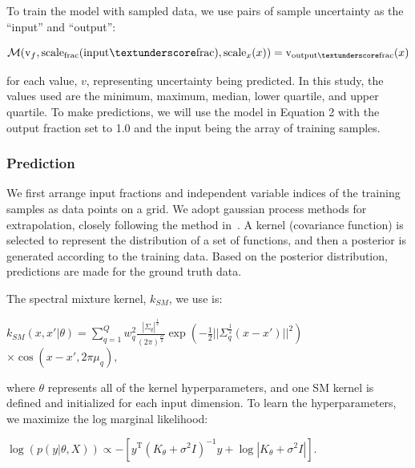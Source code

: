 To train the model with sampled data, we use pairs of sample uncertainty as the ``input'' and ``output'':

\begin{equation}
\mathcal{M}(\mathrm{v}_f, \mathrm{scale}_{\mathrm{frac}}(\mathrm{input\textunderscore frac}), \mathrm{scale}_x(x)) = \mathrm{v}_{\mathrm{output\textunderscore frac}}(x)
\end{equation}

for each value, $v$, representing uncertainty being predicted. In this study, the values used are the minimum, maximum, median, lower quartile, and upper quartile. To make predictions, we will use the model in Equation 2 with the output fraction set to 1.0 and the input being the array of training samples. 


\subsubsection{Prediction}
We first arrange input fractions and independent variable indices of the training samples as data points on a grid. We adopt gaussian process methods for extrapolation, closely following the method in~\cite{pmlr-v28-wilson13}. A kernel (covariance function) is selected to represent the distribution of a set of functions, and then a posterior is generated according to the training data. Based on the posterior distribution, predictions are made for the ground truth data.

The spectral mixture kernel, $k_{SM}$, we use is:
\begin{center}
$k_{SM}(x, x'|\theta) = $$\sum_{q=1}^{Q}$$w_q^2\frac{|\Sigma_q|^\frac{1}{2}}{(2\pi)^\frac{D}{2}}\exp(-\frac{1}{2}||\Sigma_q^\frac{1}{2}(x - x')||^2)$\\ 
$\times\cos(x - x', 2\pi\mu_q),$
\end{center}

where $\theta$ represents all of the kernel hyperparameters, and one SM kernel is defined and initialized for each input dimension. To learn the hyperparameters, we maximize the log marginal likelihood:
\begin{center}
$\log(p(y|\theta, X))\propto -[y^\mathrm{T}(K_\theta + \sigma^2I)^{-1}y + \log|K_\theta + \sigma^2I|].$
\end{center}

